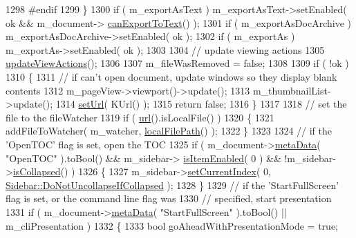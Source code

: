 \begin{DoxyCode}
1298 \textcolor{preprocessor}{#endif}
1299     \}
1300     \textcolor{keywordflow}{if} ( m\_exportAsText ) m\_exportAsText->setEnabled( ok && m\_document->
      \hyperlink{classOkular_1_1Document_a004a5cf38402e7ee4a057311ef507e10}{canExportToText}() );
1301     \textcolor{keywordflow}{if} ( m\_exportAsDocArchive ) m\_exportAsDocArchive->setEnabled( ok );
1302     \textcolor{keywordflow}{if} ( m\_exportAs ) m\_exportAs->setEnabled( ok );
1303 
1304     \textcolor{comment}{// update viewing actions}
1305     \hyperlink{classOkular_1_1Part_aa1b8d92628f48722a0538d5579451bc1}{updateViewActions}();
1306 
1307     m\_fileWasRemoved = \textcolor{keyword}{false};
1308 
1309     \textcolor{keywordflow}{if} ( !ok )
1310     \{
1311         \textcolor{comment}{// if can't open document, update windows so they display blank contents}
1312         m\_pageView->viewport()->update();
1313         m\_thumbnailList->update();
1314         \hyperlink{classKParts_1_1ReadOnlyPart_a2d64650f22a8b72d8c56ddec21717df9}{setUrl}( KUrl() );
1315         \textcolor{keywordflow}{return} \textcolor{keyword}{false};
1316     \}
1317 
1318     \textcolor{comment}{// set the file to the fileWatcher}
1319     \textcolor{keywordflow}{if} ( \hyperlink{classKParts_1_1ReadOnlyPart_aba05c3b2fd42dcfebc6585e4f746d2cb}{url}().isLocalFile() )
1320     \{
1321         addFileToWatcher( m\_watcher, \hyperlink{classKParts_1_1ReadOnlyPart_a9c411f8471de1a852c8595719d179946}{localFilePath}() );
1322     \}
1323 
1324     \textcolor{comment}{// if the 'OpenTOC' flag is set, open the TOC}
1325     \textcolor{keywordflow}{if} ( m\_document->\hyperlink{classOkular_1_1Document_a44c7c367dbe37fffeeb3d08171ff9ab6}{metaData}( \textcolor{stringliteral}{"OpenTOC"} ).toBool() && m\_sidebar->
      \hyperlink{classSidebar_af8daf68e83b592177a830b7ec35de3db}{isItemEnabled}( 0 ) && !m\_sidebar->\hyperlink{classSidebar_a7faa5e2df81f4fc935dfc85cead3efe6}{isCollapsed}() )
1326     \{
1327         m\_sidebar->\hyperlink{classSidebar_a2e8f04dcf175f5d4dc5b6961a417611e}{setCurrentIndex}( 0, 
      \hyperlink{classSidebar_af06ad6ae553bd93cabeef79df1277342a8595bb09015022393bc23cca88e491f5}{Sidebar::DoNotUncollapseIfCollapsed} );
1328     \}
1329     \textcolor{comment}{// if the 'StartFullScreen' flag is set, or the command line flag was}
1330     \textcolor{comment}{// specified, start presentation}
1331     \textcolor{keywordflow}{if} ( m\_document->\hyperlink{classOkular_1_1Document_a44c7c367dbe37fffeeb3d08171ff9ab6}{metaData}( \textcolor{stringliteral}{"StartFullScreen"} ).toBool() || m\_cliPresentation )
1332     \{
1333         \textcolor{keywordtype}{bool} goAheadWithPresentationMode = \textcolor{keyword}{true};

\end{DoxyCode}
